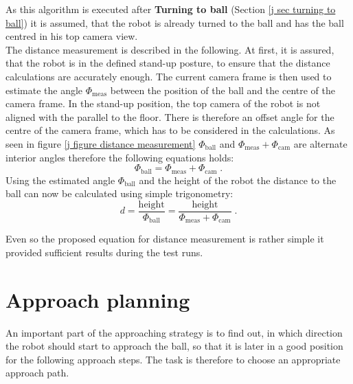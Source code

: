 As this algorithm is executed after \textbf{Turning to ball} (Section \ref{j sec turning to ball}) it is assumed, that the robot is already turned to the ball and has the ball centred in his top camera view. \\
The distance measurement is described in the following. At first, it is assured, that the robot is in the defined stand-up posture, to ensure that the distance calculations are accurately enough. The current camera frame is then used to estimate the angle $ \Phi_{\mathrm{meas}} $ between the position of the ball and the centre of the camera frame. In the stand-up position, the top camera of the robot is not aligned with the parallel to the floor. There is therefore an offset angle for the centre of the camera frame, which has to be considered in the calculations. As seen in figure \ref{j figure distance measurement} $ \Phi_{\mathrm{ball}} $ and $ \Phi_{\mathrm{meas}}+\Phi_{\mathrm{cam}} $ are alternate interior angles therefore the following equations holds: 
\begin{equation}
	\Phi_{\mathrm{ball}} = \Phi_{\mathrm{meas}}+\Phi_{\mathrm{cam}} \; .
\end{equation}
Using the estimated angle $ \Phi_{\mathrm{ball}} $ and the height of the robot the distance to the ball can now be calculated using simple trigonometry: 
\begin{equation}
	d = \frac{\mathrm{height}}{\Phi_{\mathrm{ball}}} = \frac{\mathrm{height}}{\Phi_{\mathrm{meas}}+\Phi_{\mathrm{cam}}} \; .
\end{equation}

Even so the proposed equation for distance measurement is rather simple it provided sufficient results during the test runs. 


\section{Approach planning}
An important part of the approaching strategy is to find out, in which direction the robot should start to approach the ball, so that it is later in a good position for the following approach steps. 
The task is therefore to choose an appropriate approach path.


